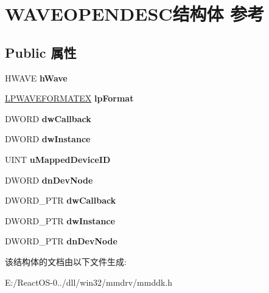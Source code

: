 \hypertarget{struct_w_a_v_e_o_p_e_n_d_e_s_c}{}\section{W\+A\+V\+E\+O\+P\+E\+N\+D\+E\+S\+C结构体 参考}
\label{struct_w_a_v_e_o_p_e_n_d_e_s_c}
\subsection*{Public 属性}
\begin{DoxyCompactItemize}
\item 
\mbox{\label{struct_w_a_v_e_o_p_e_n_d_e_s_c_aa622b3de05953076144f7ef8d91660cf}} 
H\+W\+A\+VE {\bfseries h\+Wave}
\item 
\mbox{\label{struct_w_a_v_e_o_p_e_n_d_e_s_c_a0d3aafd534b7b0e94da2e128e8d25bb5}} 
\hyperlink{struct___w_a_v_e_f_o_r_m_a_t_e_x}{L\+P\+W\+A\+V\+E\+F\+O\+R\+M\+A\+T\+EX} {\bfseries lp\+Format}
\item 
\mbox{\label{struct_w_a_v_e_o_p_e_n_d_e_s_c_ad4603455a1fe9610c922f353abbbd1bd}} 
D\+W\+O\+RD {\bfseries dw\+Callback}
\item 
\mbox{\label{struct_w_a_v_e_o_p_e_n_d_e_s_c_abac3c7ad62f8ddb2301ff2313fa602b1}} 
D\+W\+O\+RD {\bfseries dw\+Instance}
\item 
\mbox{\label{struct_w_a_v_e_o_p_e_n_d_e_s_c_ad9b8001f606bd0d9989d40ae8b38ceb8}} 
U\+I\+NT {\bfseries u\+Mapped\+Device\+ID}
\item 
\mbox{\label{struct_w_a_v_e_o_p_e_n_d_e_s_c_a314c3fe06d447a9408b87c0cbbb4910e}} 
D\+W\+O\+RD {\bfseries dn\+Dev\+Node}
\item 
\mbox{\label{struct_w_a_v_e_o_p_e_n_d_e_s_c_a1b27ae63a8e9b11b0aaf49657712d973}} 
D\+W\+O\+R\+D\+\_\+\+P\+TR {\bfseries dw\+Callback}
\item 
\mbox{\label{struct_w_a_v_e_o_p_e_n_d_e_s_c_a229daa1a3d6cf320702ee6628c3c142a}} 
D\+W\+O\+R\+D\+\_\+\+P\+TR {\bfseries dw\+Instance}
\item 
\mbox{\label{struct_w_a_v_e_o_p_e_n_d_e_s_c_a39742de7c487ca17b028d30e05457b05}} 
D\+W\+O\+R\+D\+\_\+\+P\+TR {\bfseries dn\+Dev\+Node}
\end{DoxyCompactItemize}


该结构体的文档由以下文件生成\+:\begin{DoxyCompactItemize}
\item 
E\+:/\+React\+O\+S-\/0../dll/win32/mmdrv/mmddk.\+h\end{DoxyCompactItemize}
